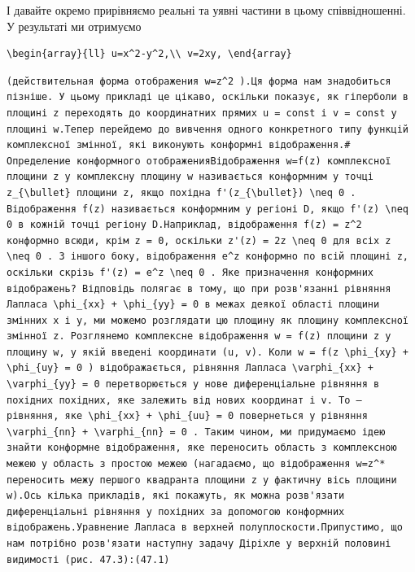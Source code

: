 \documentclass[
  ukrainian,
]{article}
\begin{document}
І давайте окремо прирівняємо реальні та уявні частини в цьому
співвідношенні. У результаті ми отримуємо

\begin{verbatim}
\begin{array}{ll} u=x^2-y^2,\\ v=2xy, \end{array}
\end{verbatim}

\begin{verbatim}
(действительная форма отображения w=z^2 ).Ця форма нам знадобиться пізніше. У цьому прикладі це цікаво, оскільки показує, як гіперболи в площині z переходять до координатних прямих u = const і v = const у площині w.Тепер перейдемо до вивчення одного конкретного типу функцій комплексної змінної, які виконують конформні відображення.# Определение конформного отображенияВідображення w=f(z) комплексної площини z у комплексну площину w називається конформним у точці z_{\bullet} площини z, якщо похідна f'(z_{\bullet}) \neq 0 . Відображення f(z) називається конформним у регіоні D, якщо f'(z) \neq 0 в кожній точці регіону D.Наприклад, відображення f(z) = z^2 конформно всюди, крім z = 0, оскільки z'(z) = 2z \neq 0 для всіх z \neq 0 . З іншого боку, відображення e^z конформно по всій площині z, оскільки скрізь f'(z) = e^z \neq 0 . Яке призначення конформних відображень? Відповідь полягає в тому, що при розв'язанні рівняння Лапласа \phi_{xx} + \phi_{yy} = 0 в межах деякої області площини змінних x і y, ми можемо розглядати цю площину як площину комплексної змінної z. Розглянемо комплексне відображення w = f(z) площини z у площину w, у якій введені координати (u, v). Коли w = f(z \phi_{xy} + \phi_{uy} = 0 ) відображається, рівняння Лапласа \varphi_{xx} + \varphi_{yy} = 0 перетворюється у нове диференціальне рівняння в похідних похідних, яке залежить від нових координат і v. To — рівняння, яке \phi_{xx} + \phi_{uu} = 0 повернеться у рівняння \varphi_{nn} + \varphi_{nn} = 0 . Таким чином, ми придумаємо ідею знайти конформне відображення, яке переносить область з комплексною межею у область з простою межею (нагадаємо, що відображення w=z^* переносить межу першого квадранта площини z у фактичну вісь площини w).Ось кілька прикладів, які покажуть, як можна розв'язати диференціальні рівняння у похідних за допомогою конформних відображень.Уравнение Лапласа в верхней полуплоскости.Припустимо, що нам потрібно розв'язати наступну задачу Діріхле у верхній половині видимості (рис. 47.3):(47.1)
\end{verbatim}
\end{document}
